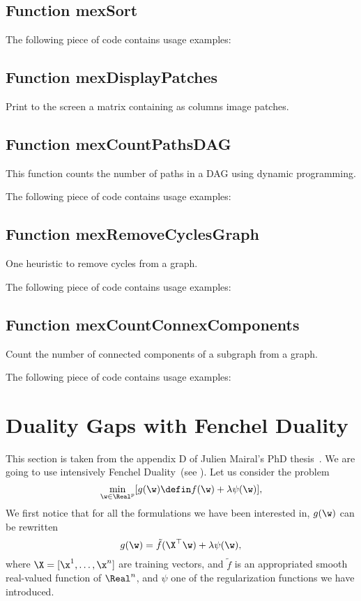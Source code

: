 \documentclass[a4paper, 11pt]{article}
\begin{document}
\subsection{Function mexSort}
%    

The following piece of code contains usage examples:


\subsection{Function mexDisplayPatches}
Print to the screen a matrix containing as columns image patches.

\subsection{Function mexCountPathsDAG}
This function counts the number of paths in a DAG using dynamic programming.

The following piece of code contains usage examples:


\subsection{Function mexRemoveCyclesGraph}
One heuristic to remove cycles from a graph.

The following piece of code contains usage examples:


\subsection{Function mexCountConnexComponents}
Count the number of connected components of a subgraph from a graph.

The following piece of code contains usage examples:


\appendix

\section{Duality Gaps with Fenchel Duality}\label{appendix}
This section is taken from the appendix D of Julien Mairal's PhD thesis~\cite{mairal11}.
We are going to use intensively Fenchel Duality~(see \cite{borwein}).
Let us consider the problem
\begin{equation}
\min_{\w \in \Real^p} [g(\w) \defin f(\w) + \lambda\psi(\w)],\label{software:eq:prb}
\end{equation}
We first notice that for all the formulations we have been
interested in, $g(\w)$ can be rewritten
\begin{equation}
g(\w) = \tilde{f}(\X^\top\w) + \lambda\psi(\w), \label{software:eq:prb2}
\end{equation}
where $\X=[\x^1,\ldots,\x^n]$ are training vectors, and $\tilde{f}$ is an
appropriated smooth real-valued function of $\Real^n$,
             and $\psi$ one of the regularization functions we have introduced.
\end{document}
